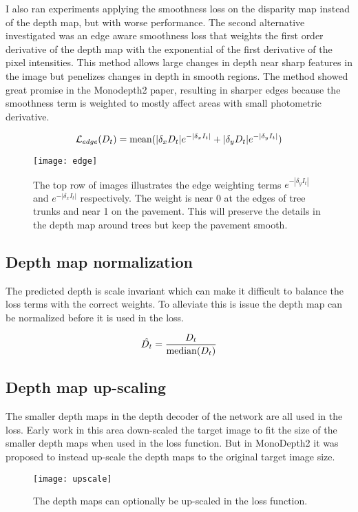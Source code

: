 I also ran experiments applying the smoothness loss on the disparity map instead of the depth map, but with worse performance. The second alternative investigated was an edge aware smoothness loss that weights the first order derivative of the depth map with the exponential of the first derivative of the pixel intensities. This method allows large changes in depth near sharp features in the image but penelizes changes in depth in smooth regions. The method showed great promise in the Monodepth2 paper, resulting in sharper edges because the smoothness term is weighted to mostly affect areas with small photometric derivative.

\[
\mathcal{L}_{edge}(D_t)=\operatorname{mean}(|\delta_x D_t|e^{-|\delta_x I_t|} + |\delta_y D_t|e^{-|\delta_y I_t|})
\]

\begin{figure}[H]
	\centering
	\texttt{[image: edge]}
	\caption{The top row of images illustrates the edge weighting terms $e^{-|\delta_y I_t|}$ and $e^{-|\delta_x I_t|}$ respectively. The weight is near 0 at the edges of tree trunks and near 1 on the pavement. This will preserve the details in the depth map around trees but keep the pavement smooth.}
	\label{fig:edge}
\end{figure}

\subsection{Depth map normalization}\label{sec:normalization}

The predicted depth is scale invariant which can make it difficult to balance the loss terms with the correct weights. To alleviate this is issue the depth map can be normalized before it is used in the loss.

\[
\hat{D_t} = \frac{D_t}{\operatorname{median}(D_t)} 
\]

\subsection{Depth map up-scaling}\label{sec:upscale}

The smaller depth maps in the depth decoder of the network are all used in the loss. Early work in this area down-scaled the target image to fit the size of the smaller depth maps when used in the loss function. But in MonoDepth2\cite{monodepth2} it was proposed to instead up-scale the depth maps to the original target image size.

\begin{figure}[H]
	\centering
	\texttt{[image: upscale]}
	\caption{The depth maps can optionally be up-scaled in the loss function.}
	\label{fig:upscale}
\end{figure}

